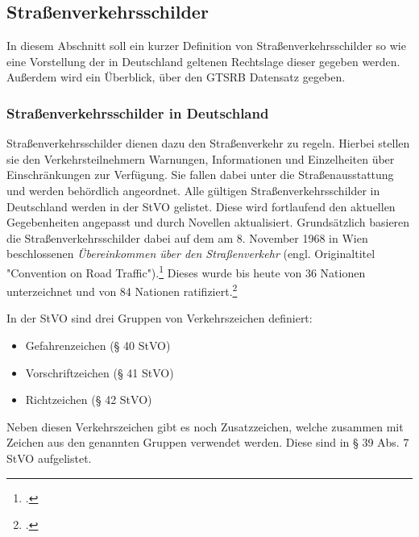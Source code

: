 \subsection{Straßenverkehrsschilder}
In diesem Abschnitt soll ein kurzer Definition von Straßenverkehrsschilder so wie eine Vorstellung der in Deutschland geltenen Rechtslage dieser gegeben werden. Außerdem wird ein Überblick, über den \ac{GTSRB} Datensatz gegeben.

\subsubsection{Straßenverkehrsschilder in Deutschland}
Straßenverkehrsschilder dienen dazu den Straßenverkehr zu regeln. Hierbei stellen sie den Verkehrsteilnehmern Warnungen, Informationen und Einzelheiten über Einschränkungen zur Verfügung. Sie fallen dabei unter die Straßenausstattung und werden behördlich angeordnet.  Alle gültigen Straßenverkehrsschilder in Deutschland werden in der \ac{StVO} gelistet. Diese wird fortlaufend den aktuellen Gegebenheiten angepasst und durch Novellen aktualisiert. Grundsätzlich basieren die Straßenverkehrsschilder dabei auf dem am 8. November 1968 in Wien beschlossenen \textit{Übereinkommen über den Straßenverkehr} (engl. Originaltitel "Convention on Road Traffic").\footcite[Vgl.][o.S.]{unConventionRoadTraffic1977} 
 Dieses wurde bis heute von 36 Nationen unterzeichnet und von 84 Nationen ratifiziert.\footcite[Vgl.][1-14]{unUnitedNationsTreaty2020}

In der \ac{StVO} sind drei Gruppen von Verkehrszeichen definiert:
\begin{itemize}
    \item Gefahrenzeichen (§ 40 \ac{StVO})
    \item Vorschriftzeichen (§ 41 \ac{StVO})
    \item Richtzeichen (§ 42 \ac{StVO})
\end{itemize}

Neben diesen Verkehrszeichen gibt es noch Zusatzzeichen, welche zusammen mit Zeichen aus den genannten Gruppen verwendet werden. Diese sind in § 39 Abs. 7 \ac{StVO} aufgelistet.



